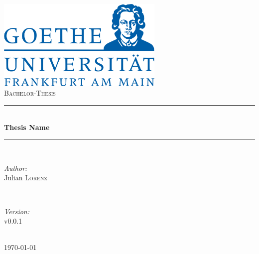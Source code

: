 \begin{titlepage}

\newcommand{\HRule}{\rule{\linewidth}{0.5mm}} %

\center %

\label{Heading}
\includegraphics[width=8cm]{pics/logo.png}\\[1.5cm] %
\textsc{\Large Bachelor-Thesis}\\[0.5cm] %

\HRule \\[0.5cm]
{ \huge \bfseries Thesis Name}\\[0.3cm] %
\HRule \\[1.5cm]

\label{Author}
\begin{minipage}{0.4\textwidth}
\begin{flushleft} \large
\emph{Author:}\\
Julian \textsc{Lorenz}
\end{flushleft}
\end{minipage}
~
\begin{minipage}{0.4\textwidth}
\begin{flushright} \large
\emph{Version:} \\
v0.0.1
\end{flushright}
\end{minipage}\\[4cm]


\label{Date}
{\large \today}\\[3cm] %


\vfill %
\end{titlepage}
